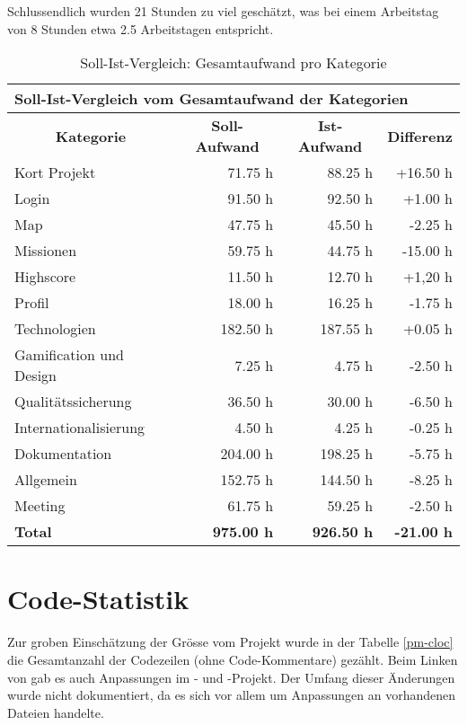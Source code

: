 Schlussendlich wurden 21 Stunden zu viel geschätzt, was bei einem Arbeitstag von 8 Stunden etwa 2.5 Arbeitstagen entspricht. 


\begin{table}[H]
\centering
\begin{tabular}{|l|r|r|r|}
\hline
\multicolumn{4}{|l|}{\textbf{Soll-Ist-Vergleich vom Gesamtaufwand der Kategorien}} \\
\hline
\multicolumn{1}{|c|}{\textbf{Kategorie}} & \multicolumn{1}{|c|}{\textbf{Soll-Aufwand}} & \multicolumn{1}{|c|}{\textbf{Ist-Aufwand}} & \multicolumn{1}{|c|}{\textbf{Differenz}}\\
\hline
Kort Projekt & 71.75 h & 88.25 h & +16.50 h \\
\hline
Login & 91.50 h & 92.50 h & +1.00 h \\
\hline
Map & 47.75	h & 45.50 h & -2.25 h \\
\hline
Missionen & 59.75 h & 44.75 h & -15.00 h \\
\hline
Highscore & 11.50 h & 12.70 h & +1,20 h \\
\hline
Profil & 18.00 h & 16.25 h & -1.75 h \\
\hline
Technologien & 182.50 h & 187.55 h & +0.05 h \\
\hline
Gamification und Design & 7.25 h & 4.75 h & -2.50 h \\
\hline
Qualitätssicherung & 36.50 h & 30.00 h & -6.50 h \\
\hline
Internationalisierung & 4.50 h & 4.25 h & -0.25 h \\
\hline
Dokumentation & 204.00 h & 198.25 h & -5.75 h \\
\hline
Allgemein & 152.75 h & 144.50 h & -8.25 h \\
\hline
Meeting & 61.75 h & 59.25 h & -2.50 h \\
\hline
\textbf{Total} & \textbf{975.00 h} & \textbf{926.50 h} & \textbf{-21.00 h} \\
\hline
\end{tabular}
\caption{Soll-Ist-Vergleich: Gesamtaufwand pro Kategorie}\label{pm-arbeitsaufwand-kategorie-ges}
\end{table}

\section{Code-Statistik}
Zur groben Einschätzung der Grösse vom Projekt wurde in der Tabelle \ref{pm-cloc} die Gesamtanzahl der  Codezeilen (ohne Code-Kommentare) gezählt. 
Beim Linken von  gab es auch Anpassungen im - und -Projekt. 
Der Umfang dieser Änderungen wurde nicht dokumentiert, da es sich vor allem um Anpassungen an vorhandenen Dateien handelte. 

